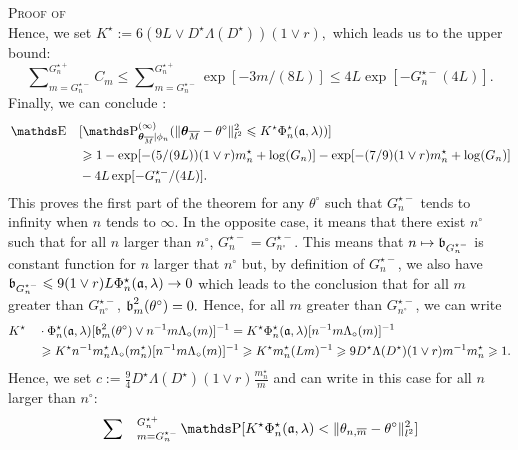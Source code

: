 \begin{pro}{\textsc{Proof of } \\}
Hence, we set $K^{\star} := 6 (9L \vee D^{\star} \Lambda(D^{\star})) (1 \vee r),$ which leads us to the upper bound:
\[\sum\nolimits_{m = G_{n}^{\star-}}^{G_{n}^{\star+}}C_{m} \leq \sum\nolimits_{m = G_{n}^{\star-}}^{G_{n}^{\star+}} \exp[- 3 m/(8 L)] \leq 4 L \exp[-G_{n}^{\star-}(4 L)].\]
Finally, we can conclude :
\begin{alignat*}{2}
& \E && [\P_{\boldsymbol{\theta}_{\overline{M}}\vert \phi_{n}}^{(\infty)}(\Vert \boldsymbol{\theta}_{\overline{M}} - \theta^{\circ} \Vert_{l^{2}}^{2} \leq K^{\star} \Phi_{n}^{\star}(\mathfrak{a}, \lambda))]\\
& && \geq 1 - \exp[- (5 / (9 L)) (1 \vee r) m_{n}^{\star} + \log(G_{n})] - \exp[- (7/9) (1 \vee r) m_{n}^{\star} + \log(G_{n})]\\
& && - 4 L \exp[- G_{n}^{\star-}/(4 L)].
\end{alignat*}
This proves the first part of the theorem for any $\theta^{\circ}$ such that $G_{n}^{\star-}$ tends to infinity when $n$ tends to $\infty$.
In the opposite case, it means that there exist $n^{\circ}$ such that for all $n$ larger than $n^{\circ}$, $G_{n}^{\star-} = G_{n^{\circ}}^{\star-}.$
This means that $n \mapsto \operatorname{\mathfrak{b}}_{G_{n}^{\star-}}$ is constant function for $n$ larger that $n^{\circ}$ but, by definition of $G_{n}^{\star-}$, we also have $\operatorname{\mathfrak{b}}_{G_{n}^{\star-}} \leqslant 9 (1 \vee r) L \Phi_{n}^{\star}(\mathfrak{a}, \lambda) \rightarrow 0$ which leads to the conclusion that for all $m$ greater than $G_{n^{\circ}}^{\star-}$, $\operatorname{\mathfrak{b}}_{m}^{2}(\theta^{\circ}) = 0.$
Hence, for all $m$ greater than $G_{n^{\circ}}^{\star-}$, we can write
\begin{alignat*}{2}
& K^{\star} && \cdot \Phi_{n}^{\star}(\mathfrak{a}, \lambda) [\operatorname{\mathfrak{b}}_{m}^{2}(\theta^{\circ}) \vee n^{-1} m \Lambda_{\circ}(m) ]^{-1} = K^{\star} \Phi_{n}^{\star}(\mathfrak{a}, \lambda) [n^{-1} m \Lambda_{\circ}(m) ]^{-1}\\
& && \geqslant K^{\star} n^{-1}m_{n}^{\star} \Lambda_{\circ}(m_{n}^{\star}) [n^{-1} m \Lambda_{\circ}(m) ]^{-1} \geqslant K^{\star} m_{n}^{\star} (L m)^{-1} \geqslant 9 D^{\star} \Lambda(D^{\star}) (1 \vee r) m^{-1} m_{n}^{\star} \geqslant 1.
\end{alignat*}
Hence, we set $c := \frac{9}{4} D^{\star} \Lambda(D^{\star}) (1 \vee r) \frac{m_{n}^{\star}}{m}$ and can write in this case for all $n$ larger than $n^{\circ}$:
\begin{alignat*}{2}
& \sum\nolimits&&_{m = G_{n}^{\star-}}^{G_{n}^{\star+}} \P[K^{\star} \Phi_{n}^{\star}(\mathfrak{a}, \lambda) < \Vert \theta_{n, \overline{m}} - \theta^{\circ} \Vert_{l^{2}}^{2}]\\

\end{alignat*}
\end{pro}
